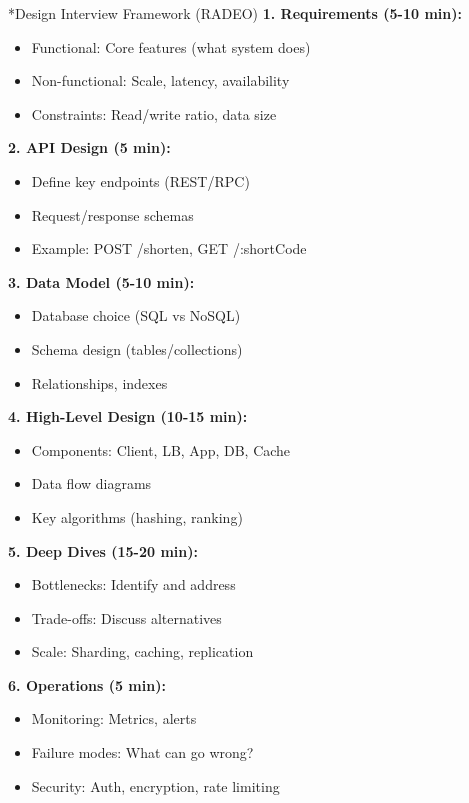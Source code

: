 \documentclass[8pt,landscape]{extarticle}
\makeatletter
\renewcommand{\subsection}{\@startsection{subsection}{2}{0pt}{3pt}{1pt}{\normalfont\normalsize\bfseries}}
\makeatother
\begin{document}
\begin{multicols*}{3}
\subsection*{Design Interview Framework (RADEO)}
\textbf{1. Requirements (5-10 min):}
\begin{itemize}
\item Functional: Core features (what system does)
\item Non-functional: Scale, latency, availability
\item Constraints: Read/write ratio, data size
\end{itemize}
\textbf{2. API Design (5 min):}
\begin{itemize}
\item Define key endpoints (REST/RPC)
\item Request/response schemas
\item Example: POST /shorten, GET /:shortCode
\end{itemize}
\textbf{3. Data Model (5-10 min):}
\begin{itemize}
\item Database choice (SQL vs NoSQL)
\item Schema design (tables/collections)
\item Relationships, indexes
\end{itemize}
\textbf{4. High-Level Design (10-15 min):}
\begin{itemize}
\item Components: Client, LB, App, DB, Cache
\item Data flow diagrams
\item Key algorithms (hashing, ranking)
\end{itemize}
\textbf{5. Deep Dives (15-20 min):}
\begin{itemize}
\item Bottlenecks: Identify and address
\item Trade-offs: Discuss alternatives
\item Scale: Sharding, caching, replication
\end{itemize}
\textbf{6. Operations (5 min):}
\begin{itemize}
\item Monitoring: Metrics, alerts
\item Failure modes: What can go wrong?
\item Security: Auth, encryption, rate limiting
\end{itemize}


\end{multicols*}
\end{document}
